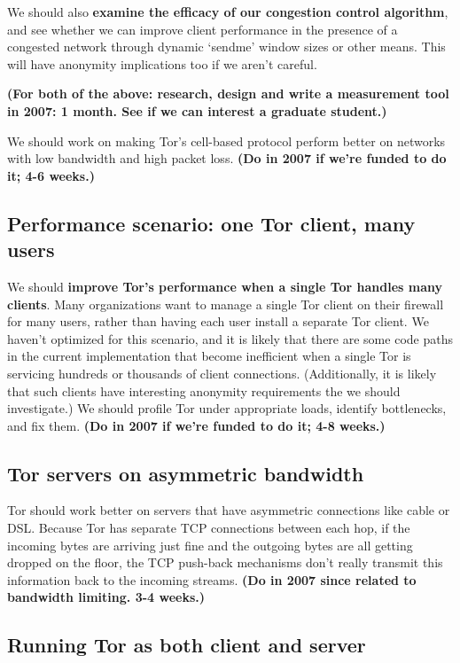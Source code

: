 \documentclass{article}
\newcommand{\plan}[1]{ {\bf (#1)}}
\begin{document}
We should also {\bf examine the efficacy of our congestion control
  algorithm}, and see whether we can improve client performance in the
presence of a congested network through dynamic `sendme' window sizes or
other means.  This will have anonymity implications too if we aren't careful.

\plan{For both of the above: research, design and write
  a measurement tool in 2007: 1 month.  See if we can interest a graduate
  student.}

We should work on making Tor's cell-based protocol  perform better on
networks with low bandwidth
and high packet loss.\plan{Do in 2007 if we're funded to do it; 4-6 weeks.}

\subsection{Performance scenario: one Tor client, many users}
We should {\bf improve Tor's performance when a single Tor handles many
  clients}.  Many organizations want to manage a single Tor client on their
firewall for many users, rather than having each user install a separate
Tor client.  We haven't optimized for this scenario, and it is likely that
there are some code paths in the current implementation that become
inefficient when a single Tor is servicing hundreds or thousands of client
connections.  (Additionally, it is likely that such clients have interesting
anonymity requirements the we should investigate.)  We should profile Tor
under appropriate loads, identify bottlenecks, and fix them.\plan{Do in 2007
  if we're funded to do it; 4-8 weeks.}

\subsection{Tor servers on asymmetric bandwidth}

Tor should work better on servers that have asymmetric connections like cable
or DSL.  Because Tor has separate TCP connections between each
hop, if the incoming bytes are arriving just fine and the outgoing bytes are
all getting dropped on the floor, the TCP push-back mechanisms don't really
transmit this information back to the incoming streams.\plan{Do in 2007 since
  related to bandwidth limiting.  3-4 weeks.}

\subsection{Running Tor as both client and server}
\end{document}
